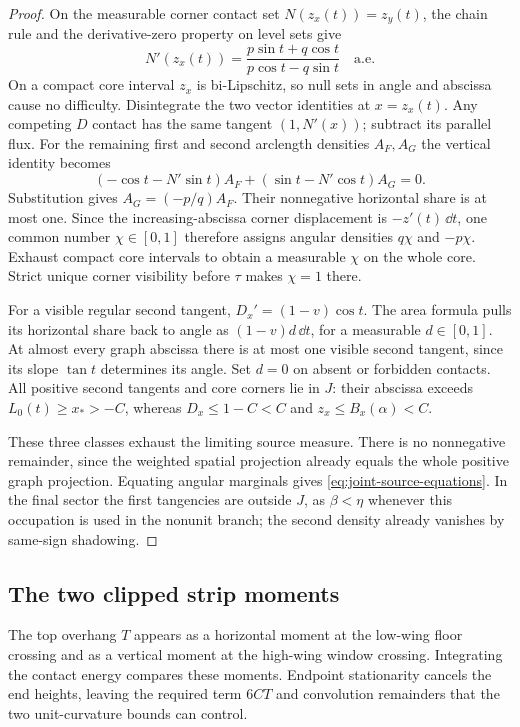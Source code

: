 \begin{proof}
On the measurable corner contact set $N(z_x(t))=z_y(t)$,
the chain rule and the derivative-zero property on level sets give
\[
 N'(z_x(t))=\frac{p\sin t+q\cos t}{p\cos t-q\sin t}
 \quad\text{a.e.}
\]
On a compact core interval $z_x$ is bi-Lipschitz, so null sets
in angle and abscissa cause no difficulty. Disintegrate the two
vector identities at $x=z_x(t)$. Any competing $D$ contact has
the same tangent $(1,N'(x))$; subtract its parallel flux.
For the remaining first and second arclength densities $A_F,A_G$
the vertical identity becomes
\[
 (-\cos t-N'\sin t)A_F+(\sin t-N'\cos t)A_G=0.
\]
Substitution gives $A_G=(-p/q)A_F$.
Their nonnegative horizontal share is at most one. Since the
increasing-abscissa corner displacement is $-z'(t)\,\dd t$,
one common number $\chi\in[0,1]$ therefore assigns angular
densities $q\chi$ and $-p\chi$. Exhaust compact core intervals
to obtain a measurable $\chi$ on the whole core. Strict unique
corner visibility before $\tau$ makes $\chi=1$ there.

For a visible regular second tangent, $D_x'=(1-v)\cos t$.
The area formula pulls its horizontal share back to angle as
$(1-v)d\,\dd t$, for a measurable $d\in[0,1]$.
At almost every graph abscissa there is at most one visible
second tangent, since its slope $\tan t$ determines its angle.
Set $d=0$ on absent or forbidden contacts.
All positive second tangents and core corners lie in $J$:
their abscissa exceeds $L_0(t)\ge x_*>-C$, whereas
$D_x\le1-C<C$ and $z_x\le B_x(\alpha)<C$.

These three classes exhaust the limiting source measure.
There is no nonnegative remainder, since the weighted spatial
projection already equals the whole positive graph projection.
Equating angular marginals gives
\cref{eq:joint-source-equations}. In the final sector the first
tangencies are outside $J$, as $\beta<\eta$ whenever this
occupation is used in the nonunit branch; the second density
already vanishes by same-sign shadowing.
\end{proof}

\subsection{The two clipped strip moments}

The top overhang $T$ appears as a horizontal moment at the low-wing
floor crossing and as a vertical moment at the high-wing window
crossing. Integrating the contact energy compares these moments.
Endpoint stationarity cancels the end heights, leaving the required
term $6CT$ and convolution remainders that the two unit-curvature
bounds can control.

